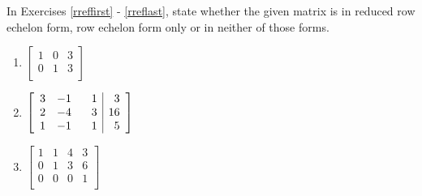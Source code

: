 \documentclass{ximera}
\begin{document}
	\author{Stitz-Zeager}



\label{ExercisesforAugMatrices}

In Exercises \ref{rreffirst} - \ref{rreflast}, state whether the given matrix is in reduced row echelon form, row echelon form only or in neither of those forms.

\begin{multicols}{3} 
\begin{enumerate}


\item $\left[ \begin{array}{rr|r} 
1 & 0 & 3 \\ 
0 & 1 & 3  \\ 
\end{array} \right]$ \label{rreffirst}

\item $\left[ \begin{array}{rrr|r} 
3 & -1 & \hphantom{-}1 & 3 \\ 
2 & -4 & 3 & 16 \\ 
1 & -1 & 1 & 5  \\
\end{array} \right]$

\item $\left[ \begin{array}{rrr|r} 
1 & 1 & 4 & 3 \\ 
0 & 1 & 3 & 6 \\ 
0 & 0 & 0 & 1  \\
\end{array} \right]$

\setcounter{HW}{\value{enumi}}
\end{enumerate}
\end{multicols}
\end{document}
